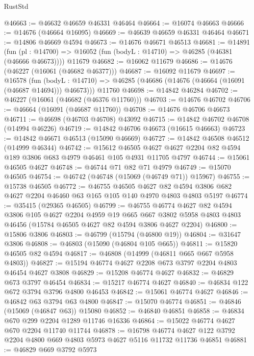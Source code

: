 \begin{lexlean}{RustStd}
\begin{coremodule}
@46663 := @46632 @46659 @46331 @46464
@46664 := @16074 @46663
@46666 := @14676 (@46664 @16095)
@46669 := @46639 @46659 @46331 @46464
@46671 := @14806 @46669 @4594
@46673 := @14676 @46671 @46513
@46681 := @14891
    (fun (pl : @14700) => @16052 (fun (bodyL : @14710) => @46285 (@46381 (@46666 @46673))))
    @11679
@46682 := @16062 @11679
@46686 := @14676 (@46227 (@16061 (@46682 @46377)))
@46687 := @16092 @11679
@46697 := @16578
    (fun (bodyL : @14710) => @46285 (@46686 (@14676 (@46664 (@16091 (@46687 @14694))) @46673)))
    @11760
@46698 := @14842 @46284
@46702 := @46227 (@16061 (@46682 (@46376 @11760)))
@46703 := @14676 @46702
@46706 := @46664 (@16091 (@46687 @11760))
@46708 := @14676 @46706 @46673
@46711 := @46698 (@46703 @46708) @43092
@46715 := @14842 @46702 @46708 (@14994 @46226)
@46719 := @14842 @46706 @46673 (@16615 @46663)
@46723 := @14842 @46671 @46513 (@15090 @46669)
@46727 := @14842 @46508 @46512 (@14999 @46344)
@46742 := @15612
    @46505
    @4627
    @4627
    @2204
    @82
    @4594
    @189
    @3806
    @683
    @4979
    @46461
    @105
    @4931
    @11705
    @4797
@46744 := @15061 @46505 @4627
@46748 := @46744 @71 @82 @71 @4979
@46749 := @15070 @46505
@46754 := @46742 (@46748 (@15069 (@46749 @71)) @15967)
@46755 := @15738 @46505
@46772 := @46755
    @46505
    @4627
    @82
    @4594
    @3806
    @682
    @4627
    @2204
    @46460
    @63
    @165
    @105
    @140
    @4970
    @4803
    @4803
    @5197
@46774 := @35415 (@29365 @46505)
@46799 := @46755
    @46774
    @4627
    @82
    @4594
    @3806
    @105
    @4627
    @2204
    @4959
    @19
    @665
    @667
    @3802
    @5958
    @4803
    @4803
    @46456
    (@15784 @46505 @4627 @82 @4594 @3806 @4627 @2204)
@46800 := @15806 @3806
@46803 := @46799 (@15794 (@46800 @19))
@46804 := @31647 @3806
@46808 := @46803 (@15090 (@46804 @105 @665))
@46811 := @15820 @46505 @82 @4594
@46817 := @46808 (@14999 (@46811 @665 @667 @5958 @4803))
@46827 := @15194 @46774 @4627 @2208 @673 @3797 @2204 @4803 @46454 @4627 @3808
@46829 := @15208 @46774 @4627
@46832 := @46829 @673 @3797 @46454
@46834 := @15217 @46774 @4627
@46840 := @46834 @122 @672 @3794 @3796 @4800 @46453
@46842 := @15061 @46774 @4627
@46846 := @46842 @63 @3794 @63 @4800
@46847 := @15070 @46774
@46851 := @46846 (@15069 (@46847 @63)) @15080
@46852 := @46840 @46851
@46858 := @46834 @670 @299 @2204 @1289 @11746 @16336
@46864 := @15022 @46774 @4627 @670 @2204 @11740 @11744
@46878 := @16798
    @46774
    @4627
    @122
    @3792
    @2204
    @4800
    @669
    @4803
    @5973
    @4627
    @5116
    @11732
    @11736
    @46851
@46881 := @46829 @669 @3792 @5973

\end{coremodule}
\end{lexlean}
